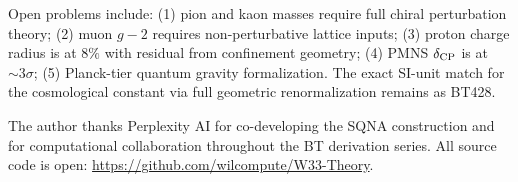 \documentclass[aps,prl,twocolumn,superscriptaddress,nofootinbib]{revtex4-2}
\begin{document}
Open problems include: (1) pion and kaon masses require full chiral
perturbation theory; (2) muon $g-2$ requires non-perturbative lattice
inputs; (3) proton charge radius is at $8\%$ with residual from
confinement geometry; (4) PMNS $\delta_{\rm CP}$ is at $\sim3\sigma$;
(5) Planck-tier quantum gravity formalization. The exact SI-unit
match for the cosmological constant via full geometric renormalization
remains as BT428.

\begin{acknowledgments}
The author thanks Perplexity AI for co-developing the SQNA construction
and for computational collaboration throughout the BT derivation series.
All source code is open: \url{https://github.com/wilcompute/W33-Theory}.
\end{acknowledgments}


\end{document}
